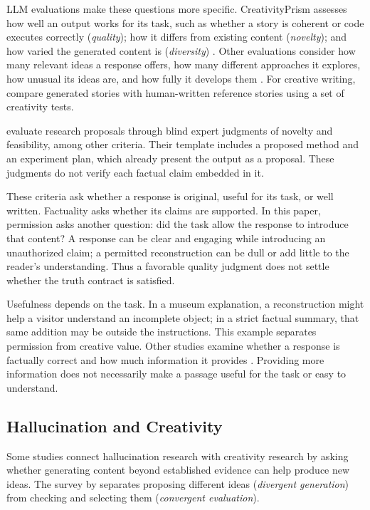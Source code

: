 \documentclass{clv2025}
\begin{document}
LLM evaluations make these questions more specific. CreativityPrism assesses
how well an output works for its task, such as whether a story is coherent
or code executes correctly (\emph{quality}); how it differs from existing
content (\emph{novelty}); and how varied the generated content is
(\emph{diversity}) \citep{hou_creativityprism_2025}.
Other evaluations consider how many relevant ideas a response offers, how
many different approaches it explores, how unusual its ideas are, and how
fully it develops them \citep{zhao_assessing_2025}. For creative writing,
\citet{li_automated_2025} compare generated stories with human-written
reference stories using a set of creativity tests.

\citet{si_ideas_2025} evaluate research proposals through blind expert
judgments of novelty and feasibility, among other criteria.
Their template includes a proposed method and an experiment plan, which
already present the output as a proposal. These judgments do not verify
each factual claim embedded in it.

These criteria ask whether a response is original, useful for its task,
or well written. Factuality asks whether its claims are supported. In this
paper, permission asks another question: did the task allow the response
to introduce that content? A response can be clear and engaging while
introducing an unauthorized claim; a permitted reconstruction can be dull
or add little to the reader's understanding. Thus a favorable quality
judgment does not settle whether the truth contract is satisfied.

Usefulness depends on the task. In a museum explanation, a reconstruction
might help a visitor understand an incomplete object; in a strict factual
summary, that same addition may be outside the instructions. This example
separates permission from creative value. Other studies examine whether a
response is factually correct and how much information it provides
\citep{wu_balancing_2025,gong_factuality_2026}. Providing more information
does not necessarily make a passage useful for the task or easy to understand.

\subsection{Hallucination and Creativity}

Some studies connect hallucination research with creativity research by
asking whether generating content beyond established evidence can help
produce new ideas. The survey by \citet{jiang_survey_2024} separates
proposing different ideas (\emph{divergent generation}) from checking and
selecting them (\emph{convergent evaluation}).
\end{document}
